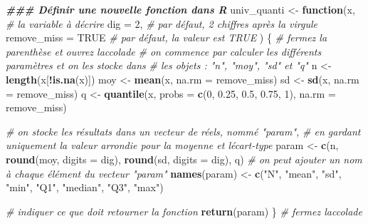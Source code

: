 \documentclass[
]{book}
\newenvironment{Shaded}{\begin{snugshade}}{\end{snugshade}}
\newcommand{\AttributeTok}[1]{\textcolor[rgb]{0.13,0.29,0.53}{#1}}
\newcommand{\CommentTok}[1]{\textcolor[rgb]{0.56,0.35,0.01}{\textit{#1}}}
\newcommand{\ConstantTok}[1]{\textcolor[rgb]{0.56,0.35,0.01}{#1}}
\newcommand{\ControlFlowTok}[1]{\textcolor[rgb]{0.13,0.29,0.53}{\textbf{#1}}}
\newcommand{\DecValTok}[1]{\textcolor[rgb]{0.00,0.00,0.81}{#1}}
\newcommand{\DocumentationTok}[1]{\textcolor[rgb]{0.56,0.35,0.01}{\textbf{\textit{#1}}}}
\newcommand{\FloatTok}[1]{\textcolor[rgb]{0.00,0.00,0.81}{#1}}
\newcommand{\FunctionTok}[1]{\textcolor[rgb]{0.13,0.29,0.53}{\textbf{#1}}}
\newcommand{\NormalTok}[1]{#1}
\newcommand{\OtherTok}[1]{\textcolor[rgb]{0.56,0.35,0.01}{#1}}
\newcommand{\SpecialCharTok}[1]{\textcolor[rgb]{0.81,0.36,0.00}{\textbf{#1}}}
\newcommand{\StringTok}[1]{\textcolor[rgb]{0.31,0.60,0.02}{#1}}
\begin{document}
\begin{Shaded}
\begin{Highlighting}[]
\DocumentationTok{\#\#\# Définir une nouvelle fonction dans R}
\NormalTok{univ\_quanti }\OtherTok{\textless{}{-}} \ControlFlowTok{function}\NormalTok{(x, }\CommentTok{\# la variable à décrire}
                        \AttributeTok{dig =} \DecValTok{2}\NormalTok{, }\CommentTok{\# par défaut, 2 chiffres après la virgule}
                        \AttributeTok{remove\_miss =} \ConstantTok{TRUE} \CommentTok{\# par défaut, la valeur est TRUE}
\NormalTok{                        ) \{ }\CommentTok{\# fermez la parenthèse et ouvrez l\textquotesingle{}accolade}
  \CommentTok{\# on commence par calculer les différents paramètres et on les stocke dans }
  \CommentTok{\# les objets : "n", "moy", "sd" et "q"}
\NormalTok{  n }\OtherTok{\textless{}{-}} \FunctionTok{length}\NormalTok{(x[}\SpecialCharTok{!}\FunctionTok{is.na}\NormalTok{(x)])     }
\NormalTok{  moy }\OtherTok{\textless{}{-}} \FunctionTok{mean}\NormalTok{(x, }\AttributeTok{na.rm =}\NormalTok{ remove\_miss)}
\NormalTok{  sd }\OtherTok{\textless{}{-}} \FunctionTok{sd}\NormalTok{(x, }\AttributeTok{na.rm =}\NormalTok{ remove\_miss)}
\NormalTok{  q }\OtherTok{\textless{}{-}} \FunctionTok{quantile}\NormalTok{(x, }\AttributeTok{probs =} \FunctionTok{c}\NormalTok{(}\DecValTok{0}\NormalTok{, }\FloatTok{0.25}\NormalTok{, }\FloatTok{0.5}\NormalTok{, }\FloatTok{0.75}\NormalTok{, }\DecValTok{1}\NormalTok{), }\AttributeTok{na.rm =}\NormalTok{ remove\_miss)}
  
  \CommentTok{\# on stocke les résultats dans un vecteur de réels, nommé "param",}
  \CommentTok{\# en gardant uniquement la valeur arrondie pour la moyenne et l\textquotesingle{}écart{-}type}
\NormalTok{  param }\OtherTok{\textless{}{-}} \FunctionTok{c}\NormalTok{(n, }
             \FunctionTok{round}\NormalTok{(moy, }\AttributeTok{digits =}\NormalTok{ dig), }
             \FunctionTok{round}\NormalTok{(sd, }\AttributeTok{digits =}\NormalTok{ dig), }
\NormalTok{             q)}
  \CommentTok{\# on peut ajouter un nom à chaque élément du vecteur "param"}
  \FunctionTok{names}\NormalTok{(param) }\OtherTok{\textless{}{-}} \FunctionTok{c}\NormalTok{(}\StringTok{"N"}\NormalTok{, }\StringTok{"mean"}\NormalTok{, }\StringTok{"sd"}\NormalTok{, }\StringTok{"min"}\NormalTok{, }\StringTok{"Q1"}\NormalTok{, }\StringTok{"median"}\NormalTok{, }\StringTok{"Q3"}\NormalTok{, }\StringTok{"max"}\NormalTok{)}
  
  \CommentTok{\# indiquer ce que doit retourner la fonction}
  \FunctionTok{return}\NormalTok{(param) }
\NormalTok{\} }\CommentTok{\# fermez l\textquotesingle{}accolade}
\end{Highlighting}
\end{Shaded}
\end{document}
